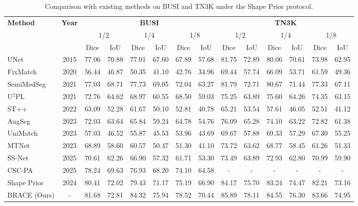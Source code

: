 \documentclass[a4paper,fleqn]{cas-dc}
\begin{document}
\begin{table}[!t]
\caption{Comparison with existing methods on BUSI and TN3K under the Shape Prior protocol.}
\centering
\setlength{\tabcolsep}{3pt}
\scriptsize
\begin{tabular}{l|c|cc|cc|cc|cc|cc|cc}
\toprule
\multirow{3}{*}{\textbf{Method}} & \multirow{3}{*}{\textbf{Year}} 
& \multicolumn{6}{c}{\textbf{BUSI}} 
& \multicolumn{6}{c}{\textbf{TN3K}} \\
\cline{3-14}
& & \multicolumn{2}{c}{1/2} & \multicolumn{2}{c}{1/4} & \multicolumn{2}{c}{1/8}
  & \multicolumn{2}{c}{1/2} & \multicolumn{2}{c}{1/4} & \multicolumn{2}{c}{1/8} \\
\cline{3-14}
& & Dice & IoU & Dice & IoU & Dice & IoU 
  & Dice & IoU & Dice & IoU & Dice & IoU \\
\hline
UNet~\cite{b16}        & 2015 & 77.06 & 70.88 & 77.01 & 67.60 & 67.89 & 57.68 & 81.75 & 72.89 & 80.06 & 70.61 & 73.98 & 62.95 \\
FixMatch~\cite{b18}    & 2020 & 56.44 & 46.87 & 50.35 & 41.10 & 42.76 & 34.96 & 69.44 & 57.74 & 66.09 & 53.71 & 61.59 & 49.36 \\
SemiMedSeg~\cite{b26}  & 2021 & 77.03 & 68.71 & 77.73 & 69.05 & 72.04 & 63.27 & 81.79 & 72.71 & 80.67 & 71.44 & 77.33 & 67.11 \\
U$^2$PL~\cite{b21}     & 2021 & 72.76 & 64.62 & 68.97 & 60.55 & 68.50 & 59.03 & 75.25 & 63.89 & 75.60 & 64.26 & 74.35 & 63.15 \\
ST++~\cite{b24}        & 2022 & 63.09 & 52.28 & 61.67 & 50.10 & 52.81 & 40.78 & 65.21 & 53.54 & 57.61 & 46.05 & 52.51 & 41.12 \\
AugSeg~\cite{b28}      & 2023 & 72.03 & 63.64 & 65.84 & 59.24 & 64.78 & 54.76 & 76.09 & 65.28 & 74.10 & 63.22 & 72.82 & 61.38 \\
UniMatch~\cite{b25}    & 2023 & 57.03 & 46.52 & 55.87 & 45.53 & 53.96 & 43.69 & 69.67 & 57.88 & 69.33 & 57.29 & 67.30 & 55.25 \\
MTNet~\cite{b52}       & 2023 & 68.89 & 58.60 & 60.57 & 50.47 & 51.30 & 41.10 & 73.72 & 63.62 & 68.77 & 58.45 & 61.26 & 51.33 \\
SS-Net~\cite{b23}      & 2025 & 70.61 & 62.26 & 66.90 & 57.32 & 61.71 & 53.30 & 73.49 & 63.89 & 72.93 & 62.80 & 70.99 & 59.90 \\
CSC-PA~\cite{b38}      & 2025 & 78.24 & 69.63 & 76.93 & 68.20 & 74.10 & 64.58 & - & - & - & - & - & - \\
Shape Prior~\cite{b2} & 2024 & 80.41 & 72.02 & 79.43 & 71.17 & 75.19 & 66.90 & 84.17 & 75.70 & 83.24 & 74.47 & 82.21 & 73.16 \\
\hline
BRACE (Ours) & - & 81.68 & 72.81 & 84.32 & 75.94 & 78.52 & 70.44 
& 85.89 & 78.11 & 84.55 & 76.30 & 83.66 & 74.95 \\
\bottomrule
\end{tabular}
\label{tab:final_busi_tn3k}
\end{table}
\end{document}
